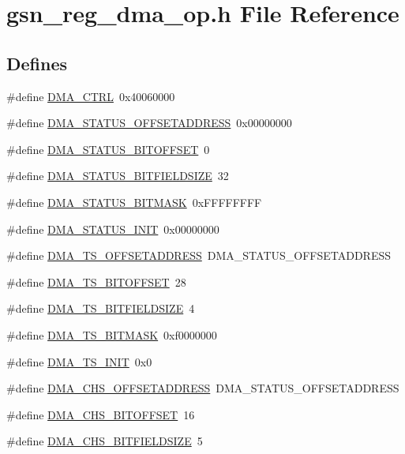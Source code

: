 \hypertarget{a00547}{
\section{gsn\_\-reg\_\-dma\_\-op.h File Reference}
\label{a00547}
}
\subsection*{Defines}
\begin{DoxyCompactItemize}
\item 
\#define \hyperlink{a00547_a8a7d92a4f5077c21611200903b7fe8b6}{DMA\_\-CTRL}~0x40060000
\item 
\#define \hyperlink{a00547_a7468fcbcee275ca417ae33054686e3f5}{DMA\_\-STATUS\_\-OFFSETADDRESS}~0x00000000
\item 
\#define \hyperlink{a00547_a0883a182ca745da40ee167a33546ddf2}{DMA\_\-STATUS\_\-BITOFFSET}~0
\item 
\#define \hyperlink{a00547_ab1c1e1c0c8bc5feb7ea7354fbf782b70}{DMA\_\-STATUS\_\-BITFIELDSIZE}~32
\item 
\#define \hyperlink{a00547_abbb907be2c04d2a418451bd7e67d1d31}{DMA\_\-STATUS\_\-BITMASK}~0xFFFFFFFF
\item 
\#define \hyperlink{a00547_a07b3d23f33e476a2b250a6c5fdb63aab}{DMA\_\-STATUS\_\-INIT}~0x00000000
\item 
\#define \hyperlink{a00547_a3fcea040d62dc0c15c7685b07b420554}{DMA\_\-TS\_\-OFFSETADDRESS}~DMA\_\-STATUS\_\-OFFSETADDRESS
\item 
\#define \hyperlink{a00547_a7f2d788f03475a58acf436e9358a977d}{DMA\_\-TS\_\-BITOFFSET}~28
\item 
\#define \hyperlink{a00547_a072f1546fc8ea82bd5e3434dc3f0822f}{DMA\_\-TS\_\-BITFIELDSIZE}~4
\item 
\#define \hyperlink{a00547_a6e865711108670ff65f50eebb85c6e6d}{DMA\_\-TS\_\-BITMASK}~0xf0000000
\item 
\#define \hyperlink{a00547_a0bfb3a78fa4daa78b640b8cfd9568247}{DMA\_\-TS\_\-INIT}~0x0
\item 
\#define \hyperlink{a00547_a0caf9f2f89504b6f6c0adf2f789b750b}{DMA\_\-CHS\_\-OFFSETADDRESS}~DMA\_\-STATUS\_\-OFFSETADDRESS
\item 
\#define \hyperlink{a00547_adadd26e82ada74d711ae27f63de8ec9d}{DMA\_\-CHS\_\-BITOFFSET}~16
\item 
\#define \hyperlink{a00547_a134f4735b50e2d6636b7c082b2057f14}{DMA\_\-CHS\_\-BITFIELDSIZE}~5
\item 

\end{DoxyCompactItemize}
